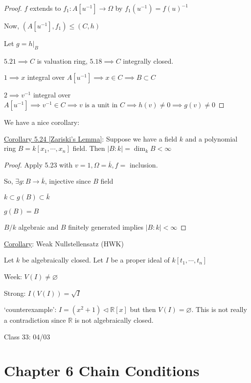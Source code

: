 \documentclass{article}
\theoremstyle{definition}
\begin{document}
\begin{proof}
    \(f\) extends to \(f_1:A[u ^{-1}] \to \Omega\) by \(f_1(u ^{-1}) = f(u)^{-1}\)  

    Now, \((A[u ^{-1}], f_1) \leq (C,h)\)
    
    Let \(g = h|_B\) 

    \(5.21 \implies C\) is valuation ring, \(5.18 \implies  C\) integrally closed.
    
    \(1 \implies x\) integral over \(A[u ^{-1}] \implies x\in C \implies B \subset C\)
    
    \(2 \implies v ^{-1}\) integral over \(A[u ^{-1}] \implies v ^{-1} \in C \implies v \text{ is a unit in } C \implies h(v) \neq 0 \implies g(v)\neq 0\)  

\end{proof}

We have a nice corollary:

\underline{Corollary 5.24 [Zariski's Lemma]}: Suppose we have a field \(k\) and a polynomial ring \(B = k[x_1,\cdots,x_n]\) field. Then \(\vert B : k \vert = \dim _k B < \infty\) 

\begin{proof}
    Apply 5.23 with \(v=1, \Omega = \overline{k} , f =\) inclusion.
    
    So, \(\exists g:B \to \overline{k}\), injective since \(B\) field 
    
    \(k \subset g(B) \subset \overline{k} \)
    
    \(g(B)=B\) 

    \(B / k\) algebraic and \(B\) finitely generated implies \(\vert B : k \vert < \infty\) 
\end{proof}

\underline{Corollary}: Weak Nullstellensatz (HWK)

Let \(k\) be algebraically closed. Let \(I\) be a proper ideal of \(k[t_1,\cdots,t_n]\)

Week: \(V(I)\neq \varnothing\)

Strong: \(I(V(I))=\sqrt{I}\) 

`counterexample': \(I = (x^2 + 1) \triangleleft \mathbb{R} [x]\) but then \(V(I)=\varnothing\). This is not really a contradiction since \(\mathbb{R}\) is not algebraically closed. 

\hrulefill

Class 33: 04/03

\section*{Chapter 6 Chain Conditions}
\end{document}
